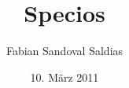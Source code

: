 \subject{Manifest}
\title{Specios}
\author{Fabian Sandoval Saldias}
\date{10. März 2011}
\publishers{\textrm{}\textrm{}}
